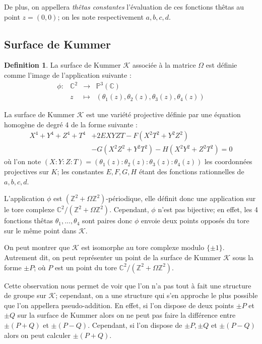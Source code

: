 \documentclass[a4paper]{article}
\theoremstyle{definition}
\newtheorem{definition}{Definition}[section]
\theoremstyle{remark}
\numberwithin{equation}{section}
\begin{document}
De plus, on appellera \emph{thêtas constantes} l'évaluation de ces fonctions thêtas au point $z=(0,0)$; on les note respectivement $a,b,c,d$.

\subsection{Surface de Kummer}

\begin{definition}
La surface de Kummer $\mathcal{K}$ associée à la matrice $\Omega$ est définie comme l'image de l'application suivante :
\begin{equation*}
\begin{array}{lrcl}
\phi :&\mathbb{C}^2 & \longrightarrow & \mathbb{P}^3(\mathbb{C}) \\
& z & \longmapsto & (\theta_1(z),\theta_2(z),\theta_3(z),\theta_4(z))
\end{array}
\end{equation*}
\end{definition}

La surface de Kummer $\mathcal{K}$ est une variété projective définie par une équation homogène de degré 4 de la forme suivante \citep{gaudry} :
\begin{align*}
X^4+Y^4+Z^4+T^4&+2EXYZT-F(X^2T^2+Y^2Z^2) \\
&-G(X^2Z^2+Y^2T^2)-H(X^2Y^2+Z^2T^2)=0
\end{align*}
où l'on note $(X:Y:Z:T)=(\theta_1(z):\theta_2(z):\theta_3(z):\theta_4(z))$ les coordonnées projectives sur $K$; les constantes $E,F,G,H$ étant des fonctions rationnelles de $a,b,c,d$.

L'application $\phi$ est $(\mathbb{Z}^2 + \Omega\mathbb{Z}^2)$-périodique, elle définit donc une application sur le tore complexe $\mathbb{C}^2/(\mathbb{Z}^2+\Omega\mathbb{Z}^2)$. Cependant, $\phi$ n'est pas bijective; en effet, les 4 fonctions thêtas $\theta_1,...,\theta_4$ sont paires donc $\phi$ envoie deux points opposés du tore sur le même point dans $\mathcal{K}$.

On peut montrer que $\mathcal{K}$ est isomorphe au tore complexe modulo $\{\pm 1\}$. Autrement dit, on peut représenter un point de la surface de Kummer $\mathcal{K}$ sous la forme $\pm P$; où $P$ est un point du tore $\mathbb{C}^2/(\mathbb{Z}^2+\Omega\mathbb{Z}^2)$.

Cette observation nous permet de voir que l'on n'a pas tout à fait une structure de groupe sur $\mathcal{K}$; cependant, on a une structure qui s'en approche le plus possible que l'on appellera pseudo-addition. En effet, si l'on dispose de deux points $\pm P$ et $\pm Q$ sur la surface de Kummer alors on ne peut pas faire la différence entre $\pm(P+Q)$ et $\pm(P-Q)$. Cependant, si l'on dispose de $\pm P,\pm Q$ et $\pm(P-Q)$ alors on peut calculer $\pm(P+Q)$.
\end{document}
